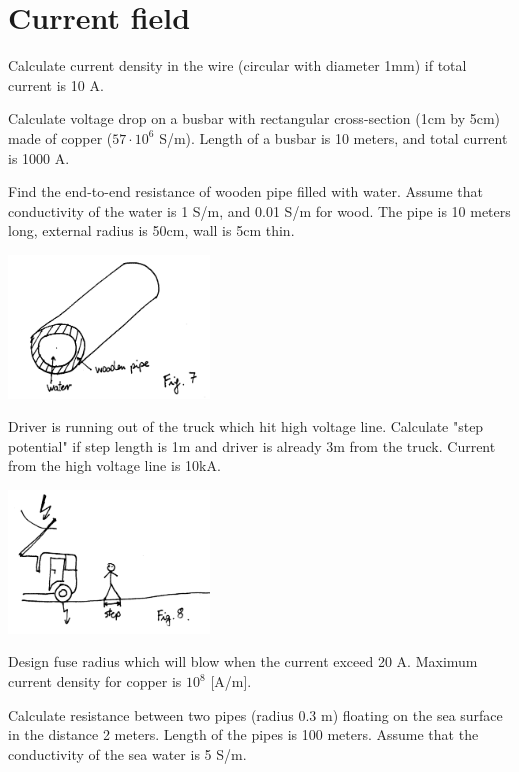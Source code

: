 \section{Current field}

\begin{Exercise}[difficulty=1]
Calculate current density in the wire (circular with diameter 1mm) if total current is 10 A.
\end{Exercise}

\begin{Exercise}[difficulty=2]
Calculate voltage drop on a busbar with rectangular cross-section (1cm by 5cm) made of copper ($57\cdot10^{6}$ S/m). Length of a busbar is 10 meters, and total current is 1000 A.
\end{Exercise}

\begin{Exercise}[difficulty=2]
Find the end-to-end resistance of wooden pipe filled with water. Assume that conductivity of the water is 1 S/m, and 0.01 S/m for wood. The pipe is 10 meters long, external radius is 50cm, wall is 5cm thin.
\begin{center}
\includegraphics[width=0.4\textwidth]{img/fig_cur1.png} 
\end{center}
\end{Exercise}

\begin{Exercise}[difficulty=3]
Driver is running out of the truck which hit high voltage line. Calculate "step potential" if step length is 1m and driver is already 3m from the truck. Current from the high voltage line is 10kA.
\begin{center}
\includegraphics[width=0.4\textwidth]{img/fig_cur2.png} 
\end{center}
\end{Exercise}

\begin{Exercise}[difficulty=2]
Design fuse radius which will blow when the current exceed 20 A. Maximum current density for copper is $10^8$ [A/m].
\end{Exercise}

\begin{Exercise}[difficulty=4]
Calculate resistance between two pipes (radius 0.3 m) floating on the sea surface in the distance 2 meters. Length of the pipes is 100 meters. Assume that the conductivity of the sea water is 5 S/m.
\end{Exercise}

